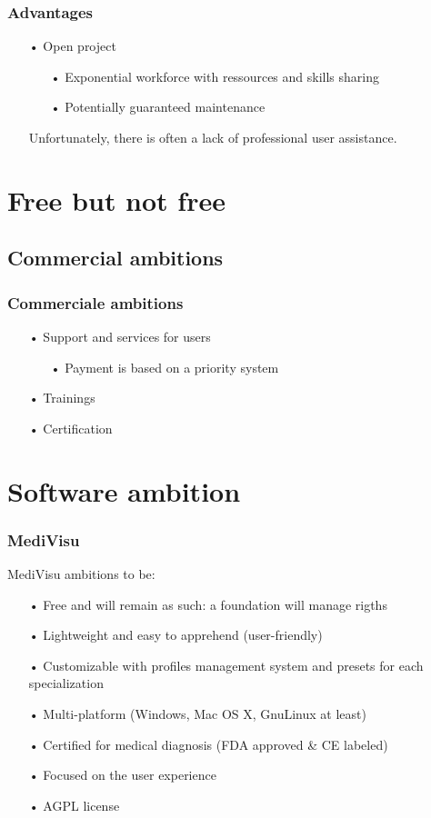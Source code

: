\documentclass[11pt]{beamer}
\begin{document}
\begin{frame}
\frametitle{Advantages}
\begin{itemize}[<+->]
\item[•] Open project
\begin{itemize}
\item[•] Exponential workforce with ressources and skills sharing
\item[•] Potentially guaranteed maintenance
\end{itemize}
\item [] Unfortunately, there is often a lack of professional user assistance.
\end{itemize}
\end{frame}

\section{Free but not free}

\subsection{Commercial ambitions}

\begin{frame}
\frametitle{Commerciale ambitions}
\begin{itemize}[<+->]
\item[•] Support and services for users
\begin{itemize}[<+->]
\item[•] Payment is based on a priority system
\end{itemize}
\item[•] Trainings
\item[•] Certification
\end{itemize}
\end{frame}

\section{Software ambition}

\begin{frame}
\frametitle{MediVisu}
MediVisu ambitions to be:
\begin{itemize}[<+->]
\item[•] Free and will remain as such: a foundation will manage rigths
\item[•] Lightweight and easy to apprehend (user-friendly)
\item[•] Customizable with profiles management system and presets for each specialization
\item[•] Multi-platform (Windows, Mac OS X, GnuLinux at least)
\item[•] Certified for medical diagnosis (FDA approved \& CE labeled)
\item[•] Focused on the user experience
\item[•] AGPL license
\end{itemize}
\end{frame}
\end{document}

